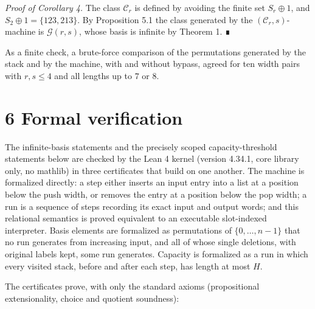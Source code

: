 \documentclass[11pt,letterpaper]{article}
\begin{document}
\emph{Proof of Corollary 4.} The class \(\mathcal C_r\) is defined by
avoiding the finite set \(S_r\oplus1\), and \(S_2\oplus1=\{123,213\}\).
By Proposition 5.1 the class generated by the
\((\mathcal C_r,s)\)-machine is \(\mathcal G(r,s)\), whose basis is
infinite by Theorem 1. ∎

As a finite check, a brute-force comparison of the permutations
generated by the stack and by the machine, with and without bypass,
agreed for ten width pairs with \(r,s\le4\) and all lengths up to \(7\)
or \(8\).

\section{6 Formal verification}\label{formal-verification}

The infinite-basis statements and the precisely scoped
capacity-threshold statements below are checked by the Lean 4 kernel
(version 4.34.1, core library only, no mathlib) in three certificates
that build on one another. The machine is formalized directly: a step
either inserts an input entry into a list at a position below the push
width, or removes the entry at a position below the pop width; a run is
a sequence of steps recording its exact input and output words; and this
relational semantics is proved equivalent to an executable slot-indexed
interpreter. Basis elements are formalized as permutations of
\(\{0,\dots,n-1\}\) that no run generates from increasing input, and all
of whose single deletions, with original labels kept, some run
generates. Capacity is formalized as a run in which every visited stack,
before and after each step, has length at most \(H\).

The certificates prove, with only the standard axioms (propositional
extensionality, choice and quotient soundness):
\end{document}
